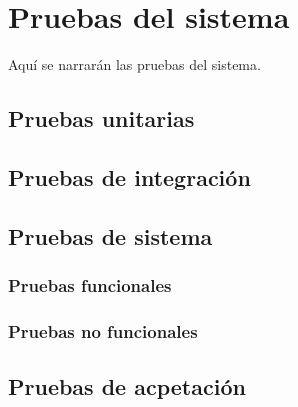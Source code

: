 \chapter{Pruebas del sistema}
Aquí se narrarán las pruebas del sistema.

\section{Pruebas unitarias}


\section{Pruebas de integración}


\section{Pruebas de sistema}


\subsection{Pruebas funcionales}


\subsection{Pruebas no funcionales}


\section{Pruebas de acpetación}